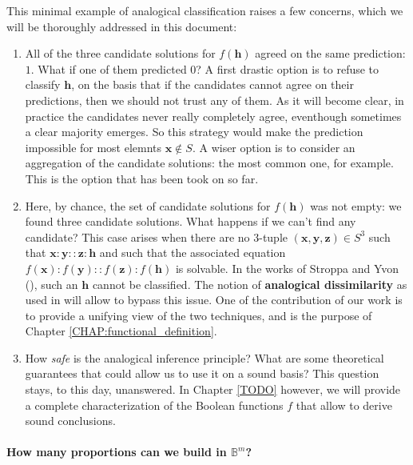 This minimal example of analogical classification raises a few concerns, which
we will be thoroughly addressed in this document:
\begin{enumerate}
  \item All of the three candidate solutions for $f(\mathbf{h})$ agreed on the
    same prediction: $1$. What if one of them predicted $0$? A first drastic
    option is to refuse to classify $\mathbf{h}$, on the basis that if the
    candidates cannot agree on their predictions, then we should not trust any
    of them. As it will become clear, in practice the candidates never really
    completely agree, eventhough sometimes a clear majority emerges. So this
    strategy would make the prediction impossible for most elemnts $\mathbf{x}
    \notin S$. A wiser option is to consider an aggregation of the candidate
    solutions: the most common one, for example. This is the option that has
    been took on so far.
  \item Here, by chance, the set of candidate solutions for $f(\mathbf{h})$ was
    not empty: we found three candidate solutions. What happens if we can't
    find any candidate? This case arises when there are no 3-tuple
    $(\mathbf{x}, \mathbf{y}, \mathbf{z}) \in S^3$ such that $\mathbf{x} :
    \mathbf{y}::\mathbf{z}:\mathbf{h}$ and such that the associated equation
    $f(\mathbf{x}):f(\mathbf{y})::f(\mathbf{z}):f(\mathbf{h})$ is solvable. In
    the works of Stroppa and Yvon (\cite{StrYvoCNLL05}), such an $\mathbf{h}$
    cannot be classified. The notion of \textbf{analogical dissimilarity}
    as used in \cite{BayMicDelIJCAI07} will allow to bypass this issue. One of
    the contribution of our work is to provide a unifying view of the two
    techniques, and is the purpose of Chapter \ref{CHAP:functional_definition}.

  \item How \textit{safe} is the analogical inference principle? What are some
    theoretical guarantees that could allow us to use it on a sound basis? This
    question stays, to this day, unanswered. In Chapter \ref{TODO} however, we
    will provide a complete characterization of the Boolean functions $f$ that
    allow to derive sound conclusions.
\end{enumerate}

\paragraph{How many proportions can we build in $\mathbb{B}^m$?\\}
\label{SEC:number_of_parallelograms_in_Bm}

